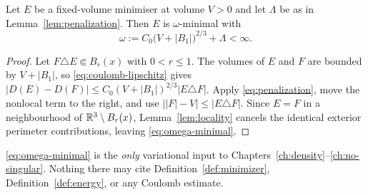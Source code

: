 \begin{lemma}\label{lem:quasiminimal}
Let $E$ be a fixed-volume minimiser at volume $V>0$ and let $\Lambda$ be as in
Lemma~\ref{lem:penalization}.  Then $E$ is $\omega$-minimal with
\[
  \omega:=C_0\bigl(V+|B_1|\bigr)^{2/3}+\Lambda<\infty .
\]
\end{lemma}

\begin{proof}
Let $F\triangle E\Subset B_r(x)$ with $0<r\le1$.  The volumes of $E$ and $F$
are bounded by $V+|B_1|$, so \eqref{eq:coulomb-lipschitz} gives
$|D(E)-D(F)|\le C_0(V+|B_1|)^{2/3}|E\triangle F|$.  Apply
\eqref{eq:penalization}, move the nonlocal term to the right, and use
$\bigl||F|-V\bigr|\le|E\triangle F|$.  Since $E=F$ in a neighbourhood of
$\mathbb R^3\setminus B_r(x)$, Lemma~\ref{lem:locality} cancels the identical
exterior perimeter contributions, leaving \eqref{eq:omega-minimal}.
\end{proof}

\begin{fnote}\label{fnote:only-input}
\eqref{eq:omega-minimal} is the \emph{only} variational input to
Chapters~\ref{ch:density}--\ref{ch:no-singular}.  Nothing there may cite
Definition~\ref{def:minimizer}, Definition~\ref{def:energy}, or any Coulomb
estimate.
\end{fnote}

